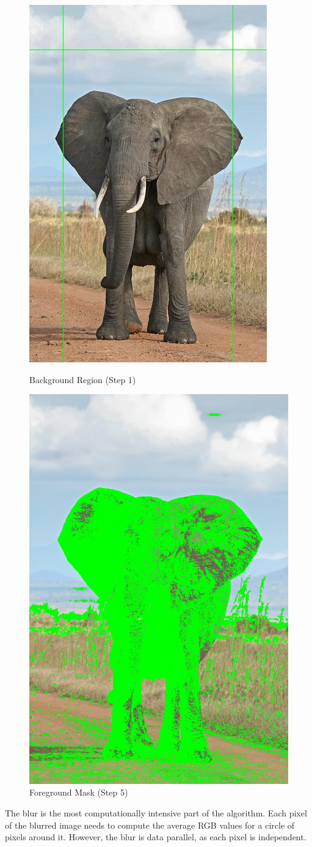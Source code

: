 \documentclass[12pt]{article}
\begin{document}
\begin{figure}[!htb]
    \begin{minipage}{0.48\textwidth}
        \centering
        \includegraphics[width=0.5\linewidth]{border.jpg}
        \caption{Background Region (Step 1)}
    \end{minipage}\hfill
    \begin{minipage}{0.48\textwidth}
        \centering
        \includegraphics[width=0.5\linewidth]{mask.jpg}
        \caption{Foreground Mask (Step 5)}
    \end{minipage}\hfill
\end{figure}

The blur is the most computationally intensive part of the algorithm. Each pixel
of the blurred image needs to compute the average RGB values for a circle
of pixels around it. However, the blur is data parallel, as each pixel is
independent.
\end{document}
